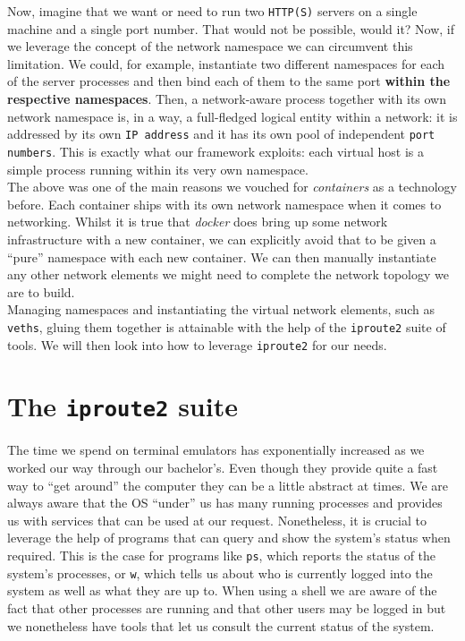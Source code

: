             Now, imagine that we want or need to run two \texttt{HTTP(S)} servers on a single machine and a single port number. That would not be possible, would it? Now, if we leverage the concept of the network namespace we can circumvent this limitation. We could, for example, instantiate two different namespaces for each of the server processes and then bind each of them to the same port \textbf{within the respective namespaces}. Then, a network-aware process together with its own network namespace is, in a way, a full-fledged logical entity within a network: it is addressed by its own \texttt{IP address} and it has its own pool of independent \texttt{port numbers}. This is exactly what our framework exploits: each virtual host is a simple process running within its very own namespace.\\

        The above was one of the main reasons we vouched for \textit{containers} as a technology before. Each container ships with its own network namespace when it comes to networking. Whilst it is true that \textit{docker} does bring up some network infrastructure with a new container, we can explicitly avoid that to be given a ``pure'' namespace with each new container. We can then manually instantiate any other network elements we might need to complete the network topology we are to build.\\

        Managing namespaces and instantiating the virtual network elements, such as \texttt{veths}, gluing them together is attainable with the help of the \texttt{iproute2} suite of tools. We will then look into how to leverage \texttt{iproute2} for our needs.\\

    \section{The \texttt{iproute2} suite}
        The time we spend on terminal emulators has exponentially increased as we worked our way through our bachelor's. Even though they provide quite a fast way to ``get around'' the computer they can be a little abstract at times. We are always aware that the OS ``under'' us has many running processes and provides us with services that can be used at our request. Nonetheless, it is crucial to leverage the help of programs that can query and show the system's status when required. This is the case for programs like \texttt{ps}, which reports the status of the system's processes, or \texttt{w}, which tells us about who is currently logged into the system as well as what they are up to. When using a shell we are aware of the fact that other processes are running and that other users may be logged in but we nonetheless have tools that let us consult the current status of the system.\\

